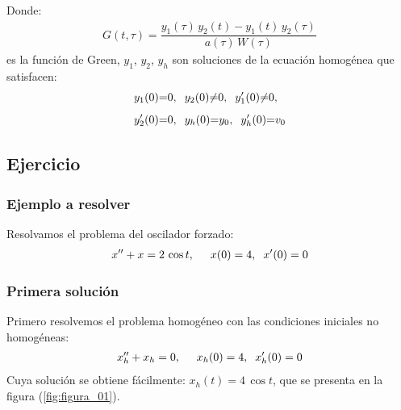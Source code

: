\documentclass[12pt]{beamer}
\begin{document}
\begin{frame}[plain]
\begin{tcolorbox}[title={\centering Solución para problema de valores iniciales con la función de Green}]
Donde:
\begin{align}
G (t, \tau) = \dfrac{y_{1} (\tau) \, y_{2} (t) - y_{1} (t) \, y_{2} (\tau)}{a (\tau) \, W (\tau)}
\label{eq:ecuacion_07_22}
\end{align}
es la función de Green, \pause $y_{1}$, $y_{2}$, $y_{h}$ son soluciones de la ecuación homogénea que satisfacen:
\begin{align*}
&y_{1} (0) {=} 0, \hspace{0.2cm} y_{2} (0) {\neq} 0, \hspace{0.2cm} {y}^{\prime}_{1} (0) {\neq} 0, \\[0.5em]
&{y}^{\prime}_{2} (0) {=} 0, \hspace{0.2cm} y_{h} (0) {=} y_{0}, \hspace{0.2cm} {y}^{\prime}_{h} (0) {=} v_{0}
\end{align*}
\end{tcolorbox}
\end{frame}

\subsection{Ejercicio}

\begin{frame}
\frametitle{Ejemplo a resolver}
Resolvamos el problema del oscilador forzado:
\pause
\begin{align*}
{x}^{\prime \prime} + x = 2 \, \cos t, \hspace{0.5cm} x (0) = 4, \hspace{0.2cm} {x}^{\prime} (0) = 0
\end{align*}
\end{frame}

\begin{frame}
\frametitle{Primera solución}
Primero resolvemos el problema homogéneo con las condiciones iniciales no homogéneas:
\pause
\begin{align*}
{x}^{\prime \prime}_{h} + x_{h} = 0, \hspace{0.5cm} x_{h} (0) = 4, \hspace{0.2cm} {x}^{\prime}_{h} (0) = 0
\end{align*}
\pause
Cuya solución se obtiene fácilmente: $x_{h} (t) = 4 \, \cos t$, que se presenta en la figura (\ref{fig:figura_01}).
\end{frame}
\end{document}
